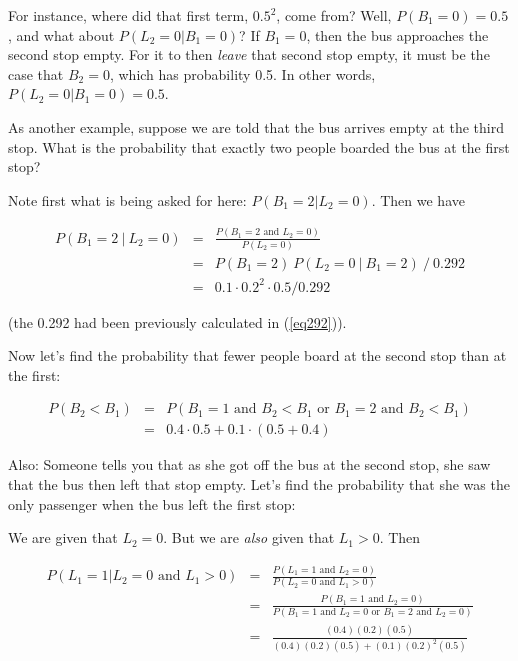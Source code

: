For instance, where did that first term, $0.5^2$, come from?
Well, $P(B_1 = 0) = 0.5$, and what about $P(L_2 = 0 | B_1 = 0)$?
If $B_1 = 0$, then the bus approaches the second stop empty.  For it to
then {\it leave} that second stop empty, it must be the case that $B_2 =
0$, which has probability 0.5.  In other words, $P(L_2 = 0 | B_1 = 0) =
0.5$.

As another example, suppose we are told that the bus arrives empty at the
third stop.  What is the probability that exactly two people boarded the
bus at the first stop?  

Note first what is being asked for here:  $P(B_1 = 2 | L_2 = 0)$.  Then
we have

\begin{eqnarray}
P(B_1 = 2 ~|~ L_2 = 0) &=&
\frac{P(B_1 = 2 \textrm{ and } L_2 = 0)}{P(L_2 = 0)} \\
&=& P(B_1 = 2) ~ P(L_2 = 0 ~|~ B_1 = 2) ~ /~  0.292 \\
&=& 0.1 \cdot 0.2^2 \cdot 0.5 / 0.292
\end{eqnarray}

(the 0.292 had been previously calculated in (\ref{eq292})).

Now let's find the probability that fewer people board at the second
stop than at the first:

\begin{eqnarray}
P(B_2 < B_1)
&=& P(B_1 = 1 \textrm{ and } B_2 < B_1 \textrm{ or }
      B_1 = 2 \textrm{ and } B_2 < B_1) \\
&=& 0.4 \cdot 0.5 +
    0.1 \cdot (0.5 + 0.4)
\end{eqnarray}

Also:  Someone tells you that as she got off the bus at the second stop,
she saw that the bus then left that stop empty.  Let's find the
probability that she was the only passenger when the bus left the first
stop:

We are given that $L_2 = 0$.  But we are {\it also} given that
$L_1 > 0$.  Then

\begin{eqnarray}
P(L_1 = 1 | L_2 = 0 \textrm{ and } L_1 > 0)&=&
   \frac
      {P(L_1 = 1 \textrm{ and } L_2 = 0)}
      {P(L_2 = 0 \textrm{ and } L_1 > 0)} \\
&=&
   \frac{P(B_1 = 1 \textrm{ and } L_2 = 0)}
   {P(
      B_1 = 1 \textrm{ and } L_2 = 0 \textrm{ or }
      B_1 = 2 \textrm{ and } L_2 = 0)} \label{l1l2} \\
&=& \frac
      {(0.4)(0.2)(0.5)}
      {(0.4)(0.2)(0.5) + (0.1)(0.2)^2(0.5)}
\end{eqnarray}


